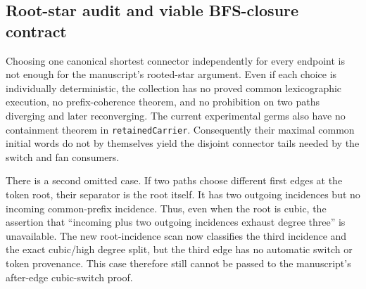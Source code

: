 \documentclass[11pt]{article}
\begin{document}
\subsection*{Root-star audit and viable BFS-closure contract}
Choosing one canonical shortest connector independently for every endpoint is
not enough for the manuscript's rooted-star argument.  Even if each choice is
individually deterministic, the collection has no proved common lexicographic
execution, no prefix-coherence theorem, and no prohibition on two paths
diverging and later reconverging.  The current experimental germs also have no
containment theorem in \texttt{retainedCarrier}.  Consequently their maximal
common initial words do not by themselves yield the disjoint connector tails
needed by the switch and fan consumers.

There is a second omitted case.  If two paths choose different first edges at
the token root, their separator is the root itself.  It has two outgoing
incidences but no incoming common-prefix incidence.  Thus, even when the root
is cubic, the assertion that ``incoming plus two outgoing incidences exhaust
degree three'' is unavailable.  The new root-incidence scan now classifies the
third incidence and the exact cubic/high degree split, but the third edge has
no automatic switch or token provenance.  This case therefore still cannot be
passed to the manuscript's after-edge cubic-switch proof.
\end{document}
